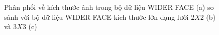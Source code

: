 {    \begin{figure}[H]
        \centering
        \caption{Phân phối về kích thước ảnh trong bộ dữ liệu WIDER FACE \cite{yang2016wider} (a) so sánh với bộ dữ liệu WIDER FACE kích thước lớn dạng lưới $2 X 2$ (b) và $3 X 3$ (c)}
        \label{fig:widerface_4k_img_size}
    \end{figure}

}
